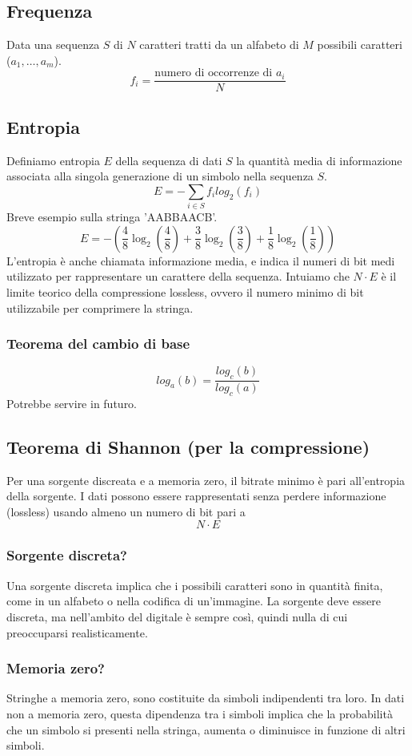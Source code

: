 \documentclass{report}
\begin{document}
	\subsection{Frequenza}
	Data una sequenza $S$ di $N$ caratteri tratti da un alfabeto di $M$ possibili caratteri ($a_1,\dots,a_m$).
	$$
	f_i = \frac{\text{numero di occorrenze di $a_i$}}{N}
	$$
		
	\subsection{Entropia}
	Definiamo entropia $E$ della sequenza di dati $S$ la quantità media di informazione associata alla singola generazione di un simbolo nella sequenza $S$.
	$$
	E = - \sum_{i \in S} f_i log_2(f_i)
	$$
	Breve esempio sulla stringa 'AABBAACB'.
	$$
	E = -(\frac{4}{8}\log_2(\frac{4}{8}) + \frac{3}{8}\log_2(\frac{3}{8})+\frac{1}{8}\log_2(\frac{1}{8}))
	$$
	L'entropia è anche chiamata informazione media, e indica il numeri di bit medi utilizzato per rappresentare un carattere della sequenza. Intuiamo che $N \cdot E$ è il limite teorico della compressione lossless, ovvero il numero minimo di bit utilizzabile per comprimere la stringa.
	\subsubsection{Teorema del cambio di base}
	$$
	log_a(b) = \frac{log_c(b)}{log_c(a)}
	$$
	Potrebbe servire in futuro.
	\subsection{Teorema di Shannon (per la compressione)}
	Per una sorgente discreata e a memoria zero, il bitrate minimo è pari all'entropia della sorgente. I dati possono essere rappresentati senza perdere informazione (lossless) usando almeno un numero di bit pari a 
	$$N \cdot E$$
	\subsubsection{Sorgente discreta?}
	Una sorgente discreta implica che i possibili caratteri sono in quantità finita, come in un alfabeto o nella codifica di un'immagine. La sorgente deve essere discreta, ma nell'ambito del digitale è sempre così, quindi nulla di cui preoccuparsi realisticamente.
		
	\subsubsection{Memoria zero?}
	Stringhe a memoria zero, sono costituite da simboli indipendenti tra loro.
	In dati non a memoria zero, questa dipendenza tra i simboli implica che la probabilità che un simbolo si presenti nella stringa, aumenta o diminuisce in funzione di altri simboli.
		
\end{document}
